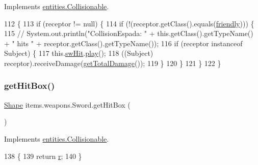 Implements \mbox{\hyperlink{interfaceentities_1_1_collisionable_aaebba0fda34be003cfe326471e1418c8}{entities.\+Collisionable}}.


\begin{DoxyCode}
112                                                     \{
113         \textcolor{keywordflow}{if} (receptor != null) \{
114             \textcolor{keywordflow}{if} (!(receptor.getClass().equals(\mbox{\hyperlink{classitems_1_1weapons_1_1_sword_a63363009ee0969e2deb6d1f3af957d58}{friendly}}))) \{
115                \textcolor{comment}{// System.out.println("CollisionEspada: " + this.getClass().getTypeName() + " hits " +
       receptor.getClass().getTypeName());}
116                 \textcolor{keywordflow}{if} (receptor instanceof Subject) \{
117                     this.\mbox{\hyperlink{classitems_1_1weapons_1_1_sword_a83b89e36fa2e2f6f6d6aa6827657cbb5}{swHit}}.\mbox{\hyperlink{classorg_1_1newdawn_1_1slick_1_1_sound_aed5db39a69e8ed57eb14053f7588ab90}{play}}();
118                     ((Subject) receptor).receiveDamage(\mbox{\hyperlink{classitems_1_1weapons_1_1_weapon_a1df8f67e5cd632d225f5419b636507a4}{getTotalDamage}}());
119                 \}
120             \}
121         \}
122     \}
\end{DoxyCode}
\mbox{\label{classitems_1_1weapons_1_1_sword_ab34faa345e31beb308cf3fbc3383aebf}} 
\subsubsection{\texorpdfstring{get\+Hit\+Box()}{getHitBox()}}
{\footnotesize\ttfamily \mbox{\hyperlink{classorg_1_1newdawn_1_1slick_1_1geom_1_1_shape}{Shape}} items.\+weapons.\+Sword.\+get\+Hit\+Box (\begin{DoxyParamCaption}{ }\end{DoxyParamCaption})\hspace{0.3cm}{\ttfamily [inline]}}



Implements \mbox{\hyperlink{interfaceentities_1_1_collisionable_a850ae5aa594d7b0d29ccef98436b8e77}{entities.\+Collisionable}}.


\begin{DoxyCode}
138                              \{
139         \textcolor{keywordflow}{return} \mbox{\hyperlink{classitems_1_1weapons_1_1_sword_a0e6a4807a1682dc6790d287b01077da9}{r}};
140     \}
\end{DoxyCode}
\mbox{\label{classitems_1_1weapons_1_1_sword_acf006a33d1194218cc4e3fa2474a401e}} 
